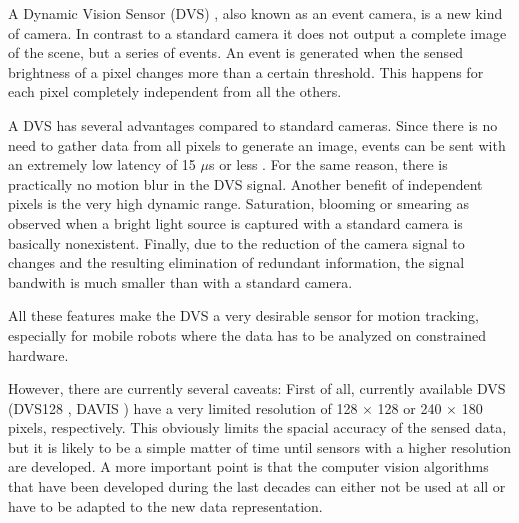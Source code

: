 A Dynamic Vision Sensor (DVS) \cite{lpd08dvs}, also known as an event camera,
is a new kind of camera. In contrast to a standard camera it does not output a
complete image of the scene, but a series of events. An event is generated when
the sensed brightness of a pixel changes more than a certain threshold. This
happens for each pixel completely independent from all the others.

A DVS has several advantages compared to standard cameras. Since there is no
need to gather data from all pixels to generate an image, events can be sent
with an extremely low latency of 15 $\mu$s or less \cite{lpd08dvs, brandli14davis}.
For the same reason, there is practically no motion blur in the DVS signal.
Another benefit of independent pixels is the very high dynamic range.
Saturation, blooming or smearing as observed when a bright light source is
captured with a standard camera is basically nonexistent. Finally, due to the
reduction of the camera signal to changes and the resulting elimination of
redundant information, the signal bandwith is much smaller than with a standard
camera.

All these features make the DVS a very desirable sensor for motion tracking,
especially for mobile robots where the data has to be analyzed on constrained
hardware.

However, there are currently several caveats: First of all, currently available
DVS (DVS128 \cite{lpd08dvs}, DAVIS \cite{brandli14davis}) have a very limited
resolution of 128 $\times$ 128 or 240 $\times$ 180 pixels, respectively. This
obviously limits the spacial accuracy of the sensed data, but it is likely to
be a simple matter of time until sensors with a higher resolution are
developed. A more important point is that the computer vision algorithms that
have been developed during the last decades can either not be used at all or
have to be adapted to the new data representation.

